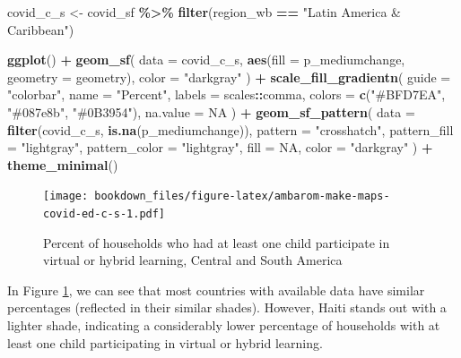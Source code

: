 \documentclass[
]{krantz}
\makeatletter
\newenvironment{Shaded}{\begin{snugshade}}{\end{snugshade}}
\newcommand{\AttributeTok}[1]{\textcolor[rgb]{0.27,0.27,0.27}{#1}}
\newcommand{\ConstantTok}[1]{\textcolor[rgb]{0.37,0.37,0.37}{#1}}
\newcommand{\FunctionTok}[1]{\textcolor[rgb]{0.27,0.27,0.27}{\textbf{#1}}}
\newcommand{\NormalTok}[1]{#1}
\newcommand{\OtherTok}[1]{\textcolor[rgb]{0.37,0.37,0.37}{#1}}
\newcommand{\SpecialCharTok}[1]{\textcolor[rgb]{0.43,0.43,0.43}{\textbf{#1}}}
\newcommand{\StringTok}[1]{\textcolor[rgb]{0.5,0.5,0.5}{#1}}
\newenvironment{kframe}{%
\medskip{}
\setlength{\fboxsep}{.8em}
 \def\at@end@of@kframe{}%
 \ifinner\ifhmode%
  \def\at@end@of@kframe{\end{minipage}}%
  \begin{minipage}{\columnwidth}%
 \fi\fi%
 \def\FrameCommand##1{\hskip\@totalleftmargin \hskip-\fboxsep
 \colorbox{shadecolor}{##1}\hskip-\fboxsep
     \hskip-\linewidth \hskip-\@totalleftmargin \hskip\columnwidth}%
 \MakeFramed {\advance\hsize-\width
   \@totalleftmargin\z@ \linewidth\hsize
   \@setminipage}}%
 {\par\unskip\endMakeFramed%
 \at@end@of@kframe}
\renewenvironment{Shaded}{\begin{kframe}}{\end{kframe}}
\makeatother
\begin{document}
\begin{Shaded}
\begin{Highlighting}[]
\NormalTok{covid\_c\_s }\OtherTok{\textless{}{-}}\NormalTok{ covid\_sf }\SpecialCharTok{\%\textgreater{}\%}
  \FunctionTok{filter}\NormalTok{(region\_wb }\SpecialCharTok{==} \StringTok{"Latin America \& Caribbean"}\NormalTok{)}

\FunctionTok{ggplot}\NormalTok{() }\SpecialCharTok{+}
  \FunctionTok{geom\_sf}\NormalTok{(}
    \AttributeTok{data =}\NormalTok{ covid\_c\_s,}
    \FunctionTok{aes}\NormalTok{(}\AttributeTok{fill =}\NormalTok{ p\_mediumchange, }\AttributeTok{geometry =}\NormalTok{ geometry),}
    \AttributeTok{color =} \StringTok{"darkgray"}
\NormalTok{  ) }\SpecialCharTok{+}
  \FunctionTok{scale\_fill\_gradientn}\NormalTok{(}
    \AttributeTok{guide =} \StringTok{"colorbar"}\NormalTok{,}
    \AttributeTok{name =} \StringTok{"Percent"}\NormalTok{,}
    \AttributeTok{labels =}\NormalTok{ scales}\SpecialCharTok{::}\NormalTok{comma,}
    \AttributeTok{colors =} \FunctionTok{c}\NormalTok{(}\StringTok{"\#BFD7EA"}\NormalTok{, }\StringTok{"\#087e8b"}\NormalTok{, }\StringTok{"\#0B3954"}\NormalTok{),}
    \AttributeTok{na.value =} \ConstantTok{NA}
\NormalTok{  ) }\SpecialCharTok{+}
  \FunctionTok{geom\_sf\_pattern}\NormalTok{(}
    \AttributeTok{data =} \FunctionTok{filter}\NormalTok{(covid\_c\_s, }\FunctionTok{is.na}\NormalTok{(p\_mediumchange)),}
    \AttributeTok{pattern =} \StringTok{"crosshatch"}\NormalTok{,}
    \AttributeTok{pattern\_fill =} \StringTok{"lightgray"}\NormalTok{,}
    \AttributeTok{pattern\_color =} \StringTok{"lightgray"}\NormalTok{,}
    \AttributeTok{fill =} \ConstantTok{NA}\NormalTok{,}
    \AttributeTok{color =} \StringTok{"darkgray"}
\NormalTok{  ) }\SpecialCharTok{+}
  \FunctionTok{theme\_minimal}\NormalTok{()}
\end{Highlighting}
\end{Shaded}

\begin{figure}
\centering
\texttt{[image: bookdown\_files/figure-latex/ambarom-make-maps-covid-ed-c-s-1.pdf]}
\caption{\label{fig:ambarom-make-maps-covid-ed-c-s}Percent of households who had at least one child participate in virtual or hybrid learning, Central and South America}
\end{figure}

In Figure \ref{fig:ambarom-make-maps-covid-ed-c-s}, we can see that most countries with available data have similar percentages (reflected in their similar shades). However, Haiti stands out with a lighter shade, indicating a considerably lower percentage of households with at least one child participating in virtual or hybrid learning.
\end{document}
